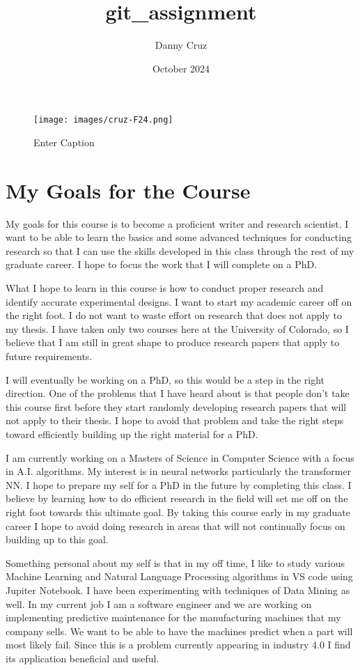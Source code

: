 \documentclass{article}
\begin{document}
\title{git_assignment}
\author{Danny Cruz}
\date{October 2024}

\begin{figure}
    \centering
    \texttt{[image: images/cruz-F24.png]}
    \caption{Enter Caption}
    \label{fig:enter-label}
\end{figure}

\section{My Goals for the Course}
My goals for this course is to become a proficient writer and research scientist. I want to be able to learn the basics and some advanced techniques for conducting research so that I can use the skills developed in this class through the rest of my graduate career. I hope to focus the work that I will complete on a PhD.

What I hope to learn in this course is how to conduct proper research and identify accurate experimental designs. I want to start my academic career off on the right foot. I do not want to waste effort on research that does not apply to my thesis. I have taken only two courses here at the University of Colorado, so I believe that I am still in great shape to produce research papers that apply to future requirements. 

I will eventually be working on a PhD, so this would be a step in the right direction. One of the problems that I have heard about is that people don't take this course first before they start randomly developing research papers that will not apply to their thesis. I hope to avoid that problem and take the right steps toward efficiently building up the right material for a PhD.

I am currently working on a Masters of Science in Computer Science with a focus in A.I. algorithms. My interest is in neural networks particularly the transformer NN. I hope to prepare my self for a PhD in the future by completing this class. I believe by learning how to do efficient research in the field will set me off on the right foot towards this ultimate goal. By taking this course early in my graduate career I hope to avoid doing research in areas that will not continually focus on building up to this goal.

Something personal about my self is that in my off time, I like to study various Machine Learning and Natural Language Processing algorithms in VS code using Jupiter Notebook. I have been experimenting with techniques of Data Mining as well. In my current job I am a software engineer and we are working on implementing predictive maintenance for the manufacturing machines that my company sells. We want to be able to have the machines predict when a part will most likely fail. Since this is a problem currently appearing in industry 4.0 I find its application beneficial and useful.
\end{document}
